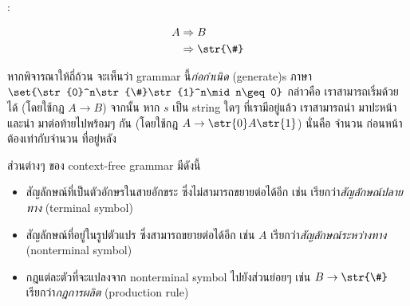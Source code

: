 \begin{example}
\begin{itemize}
\begin{multicols}{3}
\item \str{\#}:
\begin{center}
\end{center}
\begin{align*}
A
 &\Rightarrow B \\
 &\Rightarrow \str{\#} \\
\end{align*}
\end{multicols}
\end{itemize}

หากพิจารณาให้ถี่ถ้วน จะเห็นว่า grammar นี้\emph{ก่อกำเนิด} (generate)s ภาษา $\set{\str{0}^n\str{\#}\str{1}^n\mid n\geq 0}$ กล่าวคือ เราสามารถเริ่มด้วย \str{\#} ได้ (โดยใช้กฎ $A\to B$) จากนั้น หาก $s$ เป็น string ใดๆ ที่เรามีอยู่แล้ว เราสามารถนำ  มาปะหน้า และนำ  มาต่อท้ายไปพร้อมๆ กัน (โดยใช้กฎ $A\to\str{0}A\str{1}$) นั่นคือ จำนวน  ก่อนหน้า \str{\#} ต้องเท่ากับจำนวน  ที่อยู่หลัง \str{\#}
\end{example}

ส่วนต่างๆ ของ context-free grammar มีดังนี้
\begin{itemize}
\item สัญลักษณ์ที่เป็นตัวอักษรในสายอักขระ ซึ่งไม่สามารถขยายต่อได้อีก เช่น  เรียกว่า\emph{สัญลักษณ์ปลายทาง} (terminal symbol)
\item สัญลักษณ์ที่อยู่ในรูปตัวแปร ซึ่งสามารถขยายต่อได้อีก เช่น $A$ เรียกว่า\emph{สัญลักษณ์ระหว่างทาง} (nonterminal symbol)
\item กฎแต่ละตัวที่จะแปลงจาก nonterminal symbol ไปยังส่วนย่อยๆ เช่น $B\to\str{\#}$ เรียกว่า\emph{กฎการผลิต} (production rule)
\end{itemize}

